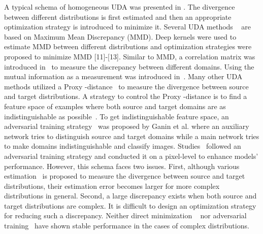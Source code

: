 \documentclass[journal,twocolumn]{IEEEtran}
\theoremstyle{definition}
\begin{document}
A typical schema of homogeneous UDA was presented in \cite{ben2010theory}.  The divergence between different distributions is first estimated and then an appropriate optimization strategy is introduced to minimize it.
Several UDA methods 
~\cite{pmlr-v37-long15,zellinger2017central,pmlr-v119-liu20m,long2017deep,long2016unsupervised}
are based on Maximum Mean Discrepancy (MMD). Deep kernels were used to estimate MMD between different distributions \cite{pmlr-v37-long15,zellinger2017central} and optimization strategies were proposed to minimize MMD [11]-[13].  Similar to MMD,  a correlation matrix was introduced in~\cite{sun2016deep} to measure the discrepancy between different domains. Using the mutual information as a measurement was introduced in~\cite{pmlr-v119-liang20a}.  
Many other UDA methods utilized a Proxy -distance~\cite{ben2010theory} to measure  the divergence between source and target distributions. A strategy to control the Proxy -distance is to find a feature space of examples where both source and target domains are as indistinguishable as possible~\cite{ben2010theory}. To get indistinguishable feature space, an adversarial training strategy~\cite{ganin2016domain} was proposed by Ganin et al. where an auxiliary network tries to distinguish source and target domains while a main network tries to make domains indistinguishable and classify images. Studies~\cite{liu2016coupled,bousmalis2017unsupervised} followed an adversarial training strategy and conducted it on a pixel-level to enhance models' performance. However, this schema faces two issues. First, although various estimation~\cite{ben2010theory,pmlr-v37-long15,zellinger2017central,sun2016deep} 
is proposed to measure the divergence between source and target distributions, their estimation error becomes larger for more complex distributions in general. Second, a large discrepancy exists when both source and target distributions are complex. It is difficult to design an optimization strategy for reducing such a discrepancy. Neither direct minimization
~\cite{pmlr-v37-long15,zellinger2017central,sun2016deep} 
nor adversarial training~\cite{8833506,arjovsky2017towards} have shown stable performance in the cases of complex distributions.
\end{document}
